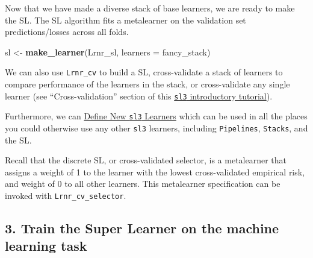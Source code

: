 \documentclass[12pt, krantz2,]{book}
\newenvironment{Shaded}{\begin{snugshade}}{\end{snugshade}}
\newcommand{\DataTypeTok}[1]{\textcolor[rgb]{0.13,0.29,0.53}{#1}}
\newcommand{\KeywordTok}[1]{\textcolor[rgb]{0.13,0.29,0.53}{\textbf{#1}}}
\newcommand{\NormalTok}[1]{#1}
\newcommand{\OperatorTok}[1]{\textcolor[rgb]{0.81,0.36,0.00}{\textbf{#1}}}
\newcommand{\StringTok}[1]{\textcolor[rgb]{0.31,0.60,0.02}{#1}}
\theoremstyle{definition}
\theoremstyle{definition}
\theoremstyle{definition}
\newcommand{\1}{\mathbbm{1}}
\begin{document}
Now that we have made a diverse stack of base learners, we are ready to make
the SL. The SL algorithm fits a metalearner on the validation set
predictions/losses across all folds.

\begin{Shaded}
\begin{Highlighting}[]
\NormalTok{sl <-}\StringTok{ }\KeywordTok{make_learner}\NormalTok{(Lrnr_sl, }\DataTypeTok{learners =}\NormalTok{ fancy_stack)}
\end{Highlighting}
\end{Shaded}

We can also use \texttt{Lrnr\_cv} to build a SL, cross-validate a stack of
learners to compare performance of the learners in the stack, or cross-validate
any single learner (see ``Cross-validation'' section of this \href{https://tlverse.org/sl3/articles/intro_sl3.html}{\texttt{sl3}
introductory tutorial}).

Furthermore, we can \href{https://tlverse.org/sl3/articles/custom_lrnrs.html}{Define New \texttt{sl3}
Learners} which can be used
in all the places you could otherwise use any other \texttt{sl3} learners, including
\texttt{Pipelines}, \texttt{Stacks}, and the SL.

Recall that the discrete SL, or cross-validated selector, is a metalearner that
assigns a weight of 1 to the learner with the lowest cross-validated empirical
risk, and weight of 0 to all other learners. This metalearner specification can
be invoked with \texttt{Lrnr\_cv\_selector}.

\begin{Shaded}
\end{Shaded}

\hypertarget{train-the-super-learner-on-the-machine-learning-task}{%
\subsection*{3. Train the Super Learner on the machine learning task}\label{train-the-super-learner-on-the-machine-learning-task}}
\end{document}
